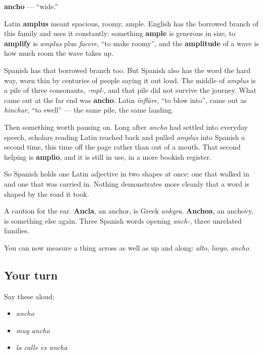 \begin{cousinweb}
\textbf{ancho} — \textquotedblleft{}wide.\textquotedblright{}

Latin \textbf{amplus} meant spacious, roomy, ample. English has the borrowed branch of this family and uses it constantly: something \textbf{ample} is generous in size, to \textbf{amplify} is \emph{amplus} plus \emph{facere}, \textquotedblleft{}to make roomy\textquotedblright{}, and the \textbf{amplitude} of a wave is how much room the wave takes up.

Spanish has that borrowed branch too. But Spanish also has the word the hard way, worn thin by centuries of people saying it out loud. The middle of \emph{amplus} is a pile of three consonants, \emph{-mpl-}, and that pile did not survive the journey. What came out at the far end was \textbf{ancho}. Latin \emph{īnflāre}, \textquotedblleft{}to blow into\textquotedblright{}, came out as \emph{hinchar}, \textquotedblleft{}to swell\textquotedblright{} — the same pile, the same landing.

Then something worth pausing on. Long after \emph{ancho} had settled into everyday speech, scholars reading Latin reached back and pulled \emph{amplus} into Spanish a second time, this time off the page rather than out of a mouth. That second helping is \textbf{amplio}, and it is still in use, in a more bookish register.

So Spanish holds one Latin adjective in two shapes at once: one that walked in and one that was carried in. Nothing demonstrates more cleanly that a word is shaped by the road it took.

A caution for the ear. \textbf{Ancla}, an anchor, is Greek \emph{ankyra}. \textbf{Anchoa}, an anchovy, is something else again. Three Spanish words opening \emph{anch-}, three unrelated families.
\end{cousinweb}

\begin{grammarlens}[title={What you've built}]
You can now measure a thing across as well as up and along: \emph{alto}, \emph{largo}, \emph{ancho}.
\end{grammarlens}

\subsection*{Your turn}
Say these aloud:

\begin{itemize}
\raggedright
  \item \emph{ancho}
  \item \emph{muy ancho}
  \item \emph{la calle es ancha}
\end{itemize}

